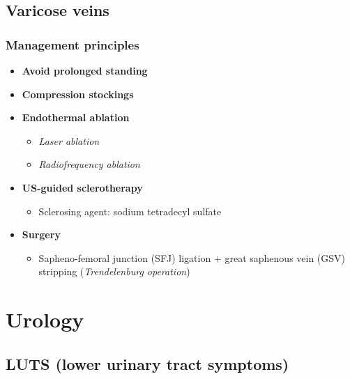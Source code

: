 \documentclass[
  12pt,
]{memoir}
\providecommand{\tightlist}{%
  \setlength{\itemsep}{0pt}\setlength{\parskip}{0pt}}
\begin{document}
\pagebreak

\hypertarget{varicose-veins}{%
\section{Varicose veins}\label{varicose-veins}}

\hypertarget{management-principles-1}{%
\subsection{Management principles}\label{management-principles-1}}

\begin{itemize}
\tightlist
\item
  \textbf{Avoid prolonged standing}
\item
  \textbf{Compression stockings}
\item
  \textbf{Endothermal ablation}

  \begin{itemize}
  \tightlist
  \item
    \emph{Laser ablation}
  \item
    \emph{Radiofrequency ablation}
  \end{itemize}
\item
  \textbf{US-guided sclerotherapy}

  \begin{itemize}
  \tightlist
  \item
    Sclerosing agent: sodium tetradecyl sulfate
  \end{itemize}
\item
  \textbf{Surgery}

  \begin{itemize}
  \tightlist
  \item
    Sapheno-femoral junction (SFJ) ligation + great saphenous vein (GSV)
    stripping (\emph{Trendelenburg operation})
  \end{itemize}
\end{itemize}

\pagebreak

\hypertarget{urology}{%
\chapter{Urology}\label{urology}}

\hypertarget{luts-lower-urinary-tract-symptoms}{%
\section{LUTS (lower urinary tract
symptoms)}\label{luts-lower-urinary-tract-symptoms}}
\end{document}
